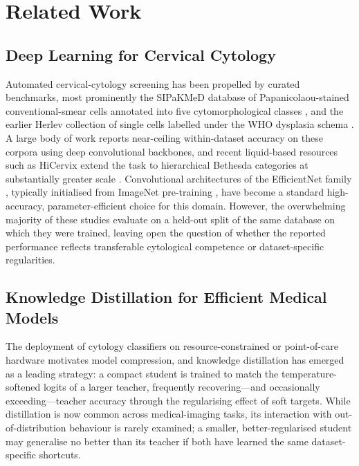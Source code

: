 \section{Related Work}

\subsection{Deep Learning for Cervical Cytology}
Automated cervical-cytology screening has been propelled by curated benchmarks, most prominently the SIPaKMeD database of Papanicolaou-stained conventional-smear cells annotated into five cytomorphological classes \citep{plissiti2018sipakmed}, and the earlier Herlev collection of single cells labelled under the WHO dysplasia schema \citep{jantzen2005herlev}. A large body of work reports near-ceiling within-dataset accuracy on these corpora using deep convolutional backbones, and recent liquid-based resources such as HiCervix extend the task to hierarchical Bethesda categories at substantially greater scale \citep{cai2024hicervix,nayar2015bethesda}. Convolutional architectures of the EfficientNet family \citep{tan2019efficientnet}, typically initialised from ImageNet pre-training \citep{deng2009imagenet}, have become a standard high-accuracy, parameter-efficient choice for this domain. However, the overwhelming majority of these studies evaluate on a held-out split of the same database on which they were trained, leaving open the question of whether the reported performance reflects transferable cytological competence or dataset-specific regularities.

\subsection{Knowledge Distillation for Efficient Medical Models}
The deployment of cytology classifiers on resource-constrained or point-of-care hardware motivates model compression, and knowledge distillation \citep{hinton2015distilling} has emerged as a leading strategy: a compact student is trained to match the temperature-softened logits of a larger teacher, frequently recovering---and occasionally exceeding---teacher accuracy through the regularising effect of soft targets. While distillation is now common across medical-imaging tasks, its interaction with out-of-distribution behaviour is rarely examined; a smaller, better-regularised student may generalise no better than its teacher if both have learned the same dataset-specific shortcuts.

